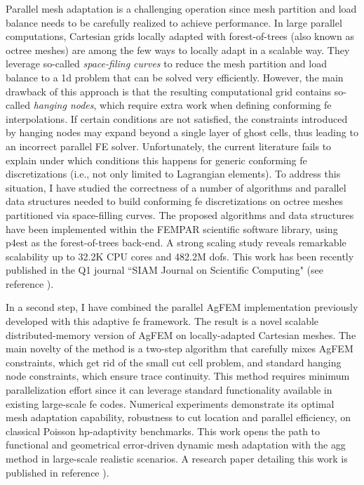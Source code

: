 \documentclass{article}
\begin{document}
 Parallel mesh adaptation is a challenging operation since mesh partition and load balance needs to be carefully realized to achieve performance.  In large parallel computations, Cartesian grids locally adapted with forest-of-trees (also known as octree meshes) are among the few ways to locally adapt in a scalable way. They leverage so-called \emph{space-filing curves} to reduce the mesh partition and load balance to a 1d problem that can be solved very efficiently. However, the main drawback of this approach is that the resulting computational grid contains so-called \emph{hanging nodes}, which require extra work when defining conforming \ac{fe} interpolations. If certain conditions are not satisfied, the constraints introduced by hanging nodes may expand beyond a single layer of ghost cells, thus leading to an incorrect parallel FE solver. Unfortunately, the current literature fails to explain under which conditions this happens for generic conforming \ac{fe} discretizations (i.e., not only limited to Lagrangian elements). To address this situation, I have studied the correctness of a number of algorithms and parallel data structures needed to build conforming \ac{fe} discretizations on octree meshes partitioned via space-filling curves.  The proposed algorithms and data structures have been implemented within the FEMPAR scientific software library, using p4est as the forest-of-trees back-end. A strong scaling study reveals remarkable scalability up to 32.2K CPU cores and 482.2M \acp{dof}. {This work has been recently published in the Q1 journal ``SIAM Journal on Scientific Computing"} (see reference \cite{Badia2019a} ).

 In a second step, I have combined the parallel AgFEM implementation previously developed with this adaptive \ac{fe} framework. The result is a novel scalable distributed-memory version of AgFEM on locally-adapted Cartesian meshes. The main novelty of the method is a two-step algorithm that carefully mixes AgFEM constraints, which get rid of the small cut cell problem, and standard hanging node constraints, which ensure trace continuity. This method requires minimum parallelization effort since it can leverage standard functionality available in existing large-scale \ac{fe} codes. Numerical experiments demonstrate its optimal mesh adaptation capability, robustness to cut location and parallel efficiency, on classical Poisson hp-adaptivity benchmarks. This work opens the path to functional and geometrical error-driven dynamic mesh adaptation with the \ac{agg} method in large-scale realistic scenarios. A research paper detailing this work is published in reference \cite{Badia2020a}).
\end{document}
